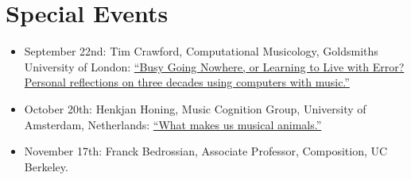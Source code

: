 \documentclass[11pt]{amsart}
\begin{document}
\section{Special Events}
\begin{itemize}

\item September 22nd: Tim Crawford, Computational Musicology, Goldsmiths University of London: \href{http://www.cirmmt.org/activities/distinguished-lectures/Tim_Crawford}{``Busy Going Nowhere, or Learning to Live with Error? Personal reflections on three decades using computers with music.''}
\item October 20th: Henkjan Honing, Music Cognition Group, University of Amsterdam, Netherlands: \href{http://www.cirmmt.org/activities/distinguished-lectures/copy_of_vorlander}{``What makes us musical animals.''}
\item November 17th: Franck Bedrossian, Associate Professor, Composition, UC Berkeley.


\end{itemize}
\end{document}
